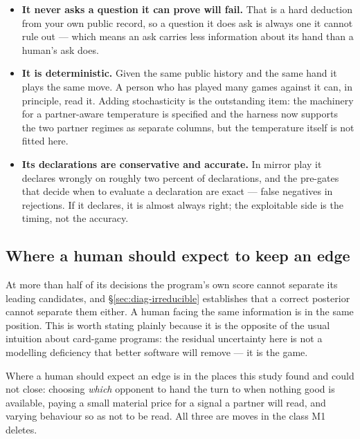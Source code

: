 \begin{itemize}
\item \textbf{It never asks a question it can prove will fail.} That is a hard deduction from your
  own public record, so a question it does ask is always one it cannot rule out --- which means an
  ask carries less information about its hand than a human's ask does.
\item \textbf{It is deterministic.} Given the same public history and the same hand it plays the
  same move. A person who has played many games against it can, in principle, read it. Adding
  stochasticity is the outstanding item: the machinery for a partner-aware temperature is specified
  and the harness now supports the two partner regimes as separate columns, but the temperature
  itself is not fitted here.
\item \textbf{Its declarations are conservative and accurate.} In mirror play it declares wrongly on
  roughly two percent of declarations, and the pre-gates that decide when to evaluate a declaration
  are exact --- \vsixGateFalseNeg{} false negatives in \vsixGateRejected{} rejections. If it
  declares, it is almost always right; the exploitable side is the timing, not the accuracy.
\end{itemize}

\subsection{Where a human should expect to keep an edge}
\label{app:human-ties}

At more than half of its decisions the program's own score cannot separate its leading candidates,
and \S\ref{sec:diag-irreducible} establishes that a correct posterior cannot separate them either.
A human facing the same information is in the same position. This is worth stating plainly because
it is the opposite of the usual intuition about card-game programs: the residual uncertainty here is
not a modelling deficiency that better software will remove --- it is the game.

Where a human should expect an edge is in the places this study found and could not close: choosing
\emph{which} opponent to hand the turn to when nothing good is available, paying a small material
price for a signal a partner will read, and varying behaviour so as not to be read. All three are
moves in the class M1 deletes.
